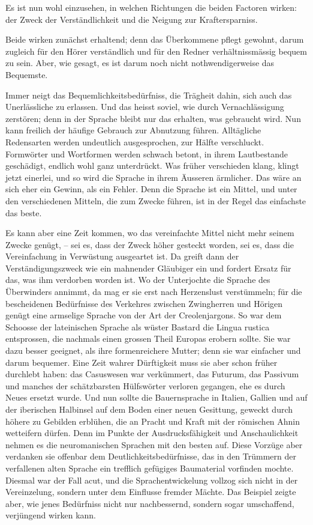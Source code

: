 {Es ist nun wohl einzusehen, in welchen Richtungen die beiden Factoren wirken: der Zweck der Verständlichkeit und die Neigung zur Kraftersparniss.

Beide wirken zunächst erhaltend; denn das Überkommene pflegt gewohnt, darum zugleich für den Hörer verständlich und für den Redner verhältnissmässig bequem zu sein. Aber, wie gesagt, es ist darum noch nicht nothwendigerweise das Bequemste.

Immer neigt das Bequemlichkeitsbedürfniss, die Trägheit dahin, sich auch das Unerlässliche zu erlassen. Und das heisst soviel, wie durch Vernachlässigung zerstören; denn in der Sprache bleibt nur das erhalten, was gebraucht wird. Nun kann freilich der häufige Gebrauch zur Abnutzung führen. Alltägliche Redensarten werden undeutlich ausgesprochen, zur Hälfte verschluckt. Formwörter und Wortformen werden schwach betont, in ihrem Lautbestande geschädigt, endlich wohl ganz unterdrückt. Was früher verschieden klang, klingt jetzt einerlei, und so wird die Sprache in ihrem Äusseren ärmlicher. Das wäre an sich eher ein Gewinn, als ein Fehler. Denn die Sprache ist ein Mittel, und unter den verschiedenen Mitteln, die zum Zwecke führen, ist in der Regel das einfachste das beste.

Es kann aber eine Zeit kommen, wo das vereinfachte Mittel nicht mehr seinem Zwecke genügt, – sei es, dass der Zweck höher gesteckt worden, sei es, dass die Vereinfachung in Verwüstung ausgeartet ist. Da greift dann der Verständigungszweck wie ein mahnender Gläubiger ein und fordert Ersatz für \label{sp.183} das, was ihm verdorben worden ist. Wo der Unterjochte die Sprache des Überwinders annimmt, da mag er sie erst nach Herzenslust verstümmeln; für die bescheidenen Bedürfnisse des Verkehres zwischen Zwingherren und Hörigen genügt eine armselige Sprache von der Art der Creolenjargons. So war dem Schoosse der lateinischen Sprache als wüster Bastard die Lingua rustica entsprossen, die nachmals einen grossen Theil Europas erobern sollte. Sie war dazu besser geeignet, als ihre formenreichere Mutter; denn sie war einfacher und darum bequemer. Eine Zeit wahrer Dürftigkeit muss sie aber schon \label{fp.193} früher durchlebt haben: das Casuswesen war verkümmert, das Futurum, das Passivum und manches der schätzbarsten Hülfswörter  verloren gegangen, ehe es durch Neues ersetzt wurde. Und nun sollte die Bauernsprache in Italien, Gallien und auf der iberischen Halbinsel auf dem Boden einer neuen Gesittung, geweckt durch höhere  zu Gebilden erblühen, die an Pracht und Kraft mit der römischen Ahnin wetteifern dürfen. Denn im Punkte der Ausdrucksfähigkeit und Anschaulichkeit nehmen es die neuromanischen Sprachen mit den besten auf. Diese Vorzüge aber verdanken sie offenbar dem Deutlichkeitsbedürfnisse, das in den Trümmern der verfallenen alten Sprache ein trefflich gefügiges Baumaterial vorfinden mochte. Diesmal war der Fall acut, und die Sprachentwickelung vollzog sich nicht in der Vereinzelung, sondern unter dem Einflusse fremder Mächte. Das Beispiel zeigte aber, wie jenes Bedürfniss nicht nur nachbessernd, sondern sogar umschaffend, verjüngend wirken kann.

}
